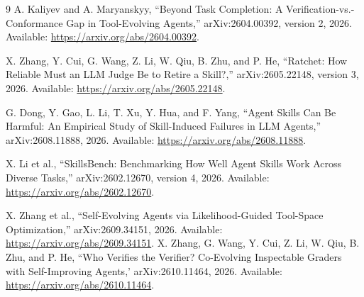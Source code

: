 \documentclass[11pt]{article}
\begin{document}
\begin{thebibliography}{9}
A. Kaliyev and A. Maryanskyy, ``Beyond Task Completion: A Verification-vs.-Conformance Gap in Tool-Evolving Agents,'' arXiv:2604.00392, version 2, 2026. Available: \url{https://arxiv.org/abs/2604.00392}.

X. Zhang, Y. Cui, G. Wang, Z. Li, W. Qiu, B. Zhu, and P. He, ``Ratchet: How Reliable Must an LLM Judge Be to Retire a Skill?,'' arXiv:2605.22148, version 3, 2026. Available: \url{https://arxiv.org/abs/2605.22148}.

G. Dong, Y. Gao, L. Li, T. Xu, Y. Hua, and F. Yang, ``Agent Skills Can Be Harmful: An Empirical Study of Skill-Induced Failures in LLM Agents,'' arXiv:2608.11888, 2026. Available: \url{https://arxiv.org/abs/2608.11888}.

X. Li et al., ``SkillsBench: Benchmarking How Well Agent Skills Work Across Diverse Tasks,'' arXiv:2602.12670, version 4, 2026. Available: \url{https://arxiv.org/abs/2602.12670}.

X. Zhang et al., ``Self-Evolving Agents via Likelihood-Guided Tool-Space Optimization,'' arXiv:2609.34151, 2026. Available: \url{https://arxiv.org/abs/2609.34151}.
X. Zhang, G. Wang, Y. Cui, Z. Li, W. Qiu, B. Zhu, and P. He, ``Who Verifies the Verifier? Co-Evolving Inspectable Graders with Self-Improving Agents,' arXiv:2610.11464, 2026. Available: \url{https://arxiv.org/abs/2610.11464}.
\end{thebibliography}
\end{document}
